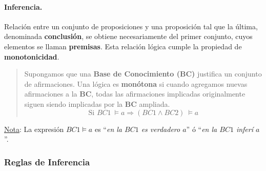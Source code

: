 \documentclass[10pt,a4paper]{article}
\begin{document}
\paragraph{Inferencia.}
Relación entre un conjunto de proposiciones y una proposición tal que la última, denominada \textbf{conclusión}, se obtiene necesariamente del primer conjunto, cuyos elementos se llaman \textbf{premisas}.  Esta relación lógica cumple la propiedad de \textbf{monotonicidad}.

\begin{quote}
Supongamos que una \textbf{Base de Conocimiento (BC)} justifica un conjunto de afirmaciones. Una lógica es \textbf{monótona} si cuando agregamos nuevas afirmaciones a la \textbf{BC}, todas las afirmaciones implicadas originalmente siguen siendo implicadas por la \textbf{BC} ampliada.
\[\text{Si }BC1 \: \models a \Rightarrow (BC1 \wedge BC2)\: \models a\]
\end{quote}

\underline{Nota}: La expresión $BC1 \models a$ es ``\textit{en la $BC1$ es verdadero $a$}'' ó ``\textit{en la $BC1$ inferí $a$}''.

\subsubsection{Reglas de Inferencia}
\end{document}
